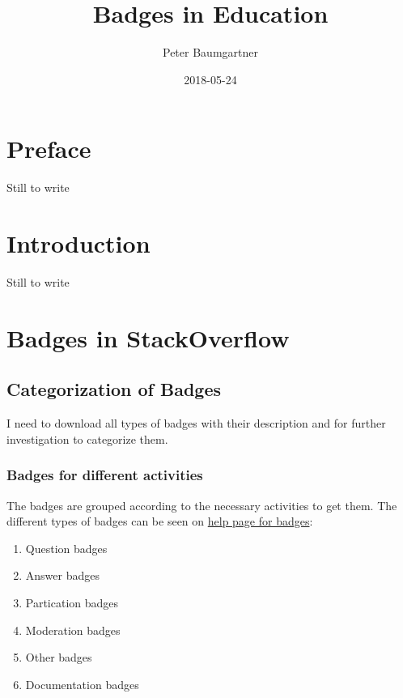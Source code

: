 \documentclass[]{book}
\title{Badges in Education}
\author{Peter Baumgartner}
\date{2018-05-24}
\providecommand{\tightlist}{%
  \setlength{\itemsep}{0pt}\setlength{\parskip}{0pt}}
\theoremstyle{definition}
\theoremstyle{definition}
\theoremstyle{definition}
\theoremstyle{remark}
\begin{document}
\maketitle

{
\setcounter{tocdepth}{1}
\tableofcontents
}
\chapter{Preface}\label{preface}

Still to write

\chapter{Introduction}\label{intro}

Still to write

\chapter{Badges in StackOverflow}\label{badges-in-stackoverflow}

\section{Categorization of Badges}\label{categorization-of-badges}

I need to download all types of badges with their description and for
further investigation to categorize them.

\subsection{Badges for different
activities}\label{badges-for-different-activities}

The badges are grouped according to the necessary activities to get
them. The different types of badges can be seen on
\href{https://stackoverflow.com/help/badges}{help page for badges}:

\begin{enumerate}
\def\labelenumi{\arabic{enumi})}
\tightlist
\item
  Question badges
\item
  Answer badges
\item
  Partication badges
\item
  Moderation badges
\item
  Other badges
\item
  Documentation badges
\end{enumerate}
\end{document}
